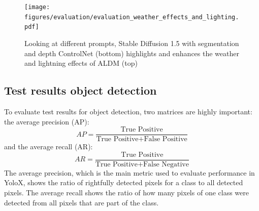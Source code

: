 \begin{figure}[H]
  \centering
  \texttt{[image: figures/evaluation/evaluation\_weather\_effects\_and\_lighting.pdf]}
  \caption{Looking at different prompts, Stable Diffusion 1.5 with segmentation and depth ControlNet (bottom) highlights and enhances the weather and lightning effects of ALDM (top)}
  \label{fig:weather_conditions}
  \clearpage
\end{figure}

\subsection{Test results object detection}
\label{sec:test_results_object_detection}

To evaluate test results for object detection, two matrices are highly important: the average precision (AP):
$$AP = \frac{\text{True Positive}}{\text{True Positive} + \text{False Positive}}$$
and the average recall (AR):
$$AR = \frac{\text{True Positive}}{\text{True Positive} + \text{False Negative}}$$
The average precision, which is the main metric used to evaluate performance in YoloX, shows the ratio of rightfully detected pixels for a class to all detected pixels. The average recall shows the ratio of how many pixels of one class were detected from all pixels that are part of the class.

